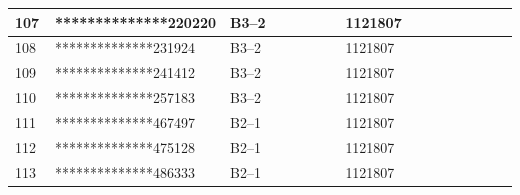 \documentclass[UTF8,10pt,a4paper,fontset=fandol]{ctexart}
\newcommand{\fieldvalue}[1]{#1}
\begin{document}
\begin{center}
\begin{tabular}{|p{0.08\linewidth}|p{0.30\linewidth}|p{0.25\linewidth}|p{0.22\linewidth}|p{0.15\linewidth}|}
\fieldvalue{107}
&
\fieldvalue{**************220220}
&
\fieldvalue{B3--2}
&
\fieldvalue{1121807}
& \\ \hline
\fieldvalue{108}
&
\fieldvalue{**************231924}
&
\fieldvalue{B3--2}
&
\fieldvalue{1121807}
& \\ \hline
\fieldvalue{109}
&
\fieldvalue{**************241412}
&
\fieldvalue{B3--2}
&
\fieldvalue{1121807}
& \\ \hline
\fieldvalue{110}
&
\fieldvalue{**************257183}
&
\fieldvalue{B3--2}
&
\fieldvalue{1121807}
& \\ \hline
\fieldvalue{111}
&
\fieldvalue{**************467497}
&
\fieldvalue{B2--1}
&
\fieldvalue{1121807}
& \\ \hline
\fieldvalue{112}
&
\fieldvalue{**************475128}
&
\fieldvalue{B2--1}
&
\fieldvalue{1121807}
& \\ \hline
\fieldvalue{113}
&
\fieldvalue{**************486333}
&
\fieldvalue{B2--1}
&
\fieldvalue{1121807}
& \\ \hline

\end{tabular}
\end{center}
\end{document}
